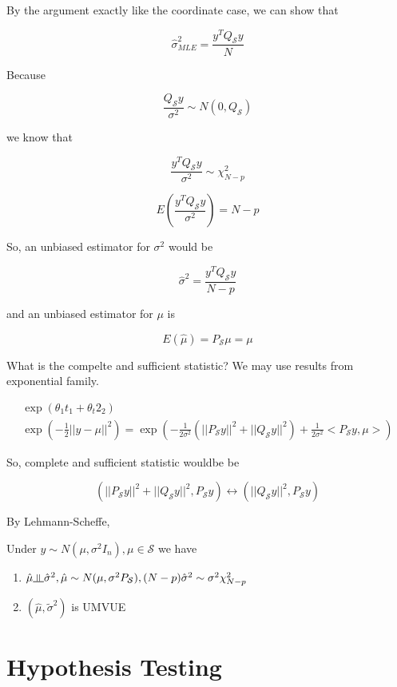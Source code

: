 \documentclass[11pt,fleqn]{book} %
\newcommand{\indep}{\rotatebox[origin=c]{90}{$\models$}}
\begin{document}
By the argument exactly like the coordinate case, we can show that 

$$\hat{\sigma}^2_{MLE} = \frac{y^TQ_\mathcal{S}y}{N}$$

Because 

$$ \frac{Q_\mathcal{S}y}{\sigma^2} \sim N(0, Q_\mathcal{S}) $$

we know that 

$$\frac{y^TQ_\mathcal{S}y}{\sigma^2} \sim \chi^2_{N-p} $$

$$E(\frac{y^TQ_\mathcal{S}y}{\sigma^2}) = N-p $$

So, an unbiased estimator for $\sigma^2$ would be 

$$\hat{\sigma}^2 = \frac{y^TQ_\mathcal{S}y}{N-p} $$

and an unbiased estimator for $\mu$ is

$$ E(\hat{\mu}) = P_\mathcal{S}\mu = \mu$$

What is the compelte and sufficient statistic? We may use results from exponential family. 

\begin{align*}
	\exp(\theta_1 t_1 + \theta_t 2_2)\\
	\exp(-\frac{1}{2} ||y - \mu ||^2)= \exp(-\frac{1}{2\sigma^2}(||P_\mathcal{S}y ||^2 + || Q_{\mathcal{S}}y||^2) + \frac{1}{2\sigma^2} <P_\mathcal{S}y, \mu>) 
\end{align*}

So, complete and sufficient statistic wouldbe be

$$(||P_\mathcal{S}y ||^2 + || Q_{\mathcal{S}}y||^2,P_\mathcal{S}y )  \leftrightarrow (|| Q_{\mathcal{S}}y||^2,P_\mathcal{S}y) $$

By Lehmann-Scheffe,

\begin{theorem}
	Under $y \sim N(\mu, \sigma^2 I_n), \mu \in \mathcal{S}$ we have
	\begin{enumerate}
		\item $\hat{\mu} \indep \hat{\sigma}^2, \hat{\mu} \sim N(\mu, \sigma^2 P_\mathcal{S}), (N-p)\hat{\sigma}^2 \sim \sigma^2 \chi^2_{N-p} $
		\item $(\hat{\mu}, \tilde{\sigma}^2)$ is UMVUE 
	\end{enumerate}
\end{theorem}

\section{Hypothesis Testing}
\end{document}
